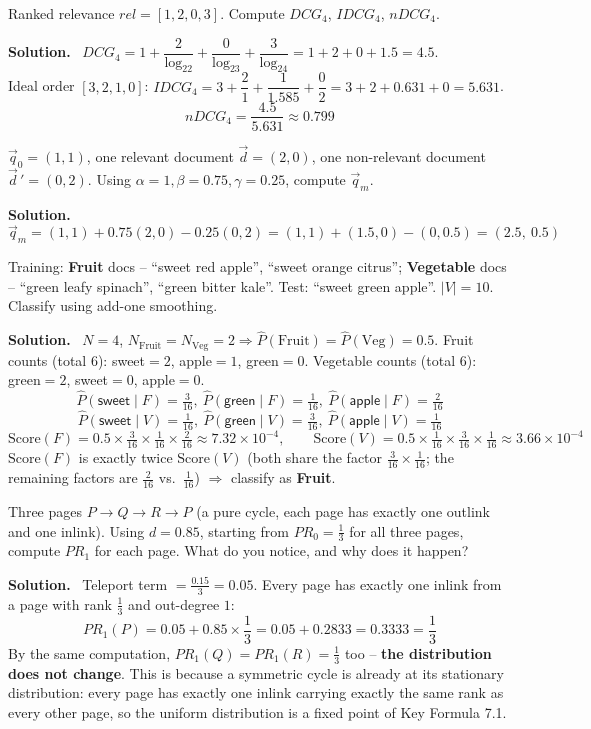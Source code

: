 \documentclass[11pt, a4paper]{article}
\newcommand{\Solution}{\medskip\noindent\textbf{\color{exgreen}Solution.}\ }
\begin{document}
\begin{exercisebox}
Ranked relevance $rel=[1,2,0,3]$. Compute $DCG_4$, $IDCG_4$, $nDCG_4$.
\end{exercisebox}
\Solution
$DCG_4 = 1+\dfrac{2}{\log_22}+\dfrac{0}{\log_23}+\dfrac{3}{\log_24} = 1+2+0+1.5=4.5$.\\
Ideal order $[3,2,1,0]$: $IDCG_4 = 3+\dfrac{2}{1}+\dfrac{1}{1.585}+\dfrac{0}{2} = 3+2+0.631+0=5.631$.
\[
nDCG_4 = \frac{4.5}{5.631} \approx 0.799
\]

\begin{exercisebox}
$\vec q_0=(1,1)$, one relevant document $\vec d=(2,0)$, one non-relevant document $\vec d\,'=(0,2)$. Using $\alpha=1,\beta=0.75,\gamma=0.25$, compute $\vec q_m$.
\end{exercisebox}
\Solution
\[
\vec q_m = (1,1) + 0.75(2,0) - 0.25(0,2) = (1,1)+(1.5,0)-(0,0.5) = (2.5,\ 0.5)
\]

\begin{exercisebox}
Training: \textbf{Fruit} docs -- ``sweet red apple'', ``sweet orange citrus''; \textbf{Vegetable} docs -- ``green leafy spinach'', ``green bitter kale''. Test: ``sweet green apple''. $|V|=10$. Classify using add-one smoothing.
\end{exercisebox}
\Solution
$N=4$, $N_{\text{Fruit}}=N_{\text{Veg}}=2 \Rightarrow \hat P(\text{Fruit})=\hat P(\text{Veg})=0.5$. Fruit counts (total $6$): sweet$=2$, apple$=1$, green$=0$. Vegetable counts (total $6$): green$=2$, sweet$=0$, apple$=0$.
\[
\hat P(\textsf{sweet}\mid F)=\tfrac{3}{16},\ \hat P(\textsf{green}\mid F)=\tfrac{1}{16},\ \hat P(\textsf{apple}\mid F)=\tfrac{2}{16}
\]
\[
\hat P(\textsf{sweet}\mid V)=\tfrac{1}{16},\ \hat P(\textsf{green}\mid V)=\tfrac{3}{16},\ \hat P(\textsf{apple}\mid V)=\tfrac{1}{16}
\]
\[
\text{Score}(F) = 0.5\times\tfrac{3}{16}\times\tfrac{1}{16}\times\tfrac{2}{16} \approx 7.32\times10^{-4}, \qquad
\text{Score}(V) = 0.5\times\tfrac{1}{16}\times\tfrac{3}{16}\times\tfrac{1}{16} \approx 3.66\times10^{-4}
\]
$\text{Score}(F)$ is exactly twice $\text{Score}(V)$ (both share the factor $\tfrac{3}{16}\times\tfrac1{16}$; the remaining factors are $\tfrac{2}{16}$ vs.\ $\tfrac1{16}$) $\Rightarrow$ classify as \textbf{Fruit}.

\begin{exercisebox}
Three pages $P\to Q\to R\to P$ (a pure cycle, each page has exactly one outlink and one inlink). Using $d=0.85$, starting from $PR_0=\tfrac13$ for all three pages, compute $PR_1$ for each page. What do you notice, and why does it happen?
\end{exercisebox}
\Solution
Teleport term $=\frac{0.15}{3}=0.05$. Every page has exactly one inlink from a page with rank $\tfrac13$ and out-degree $1$:
\[
PR_1(P) = 0.05 + 0.85\times\frac13 = 0.05+0.2833 = 0.3333 = \frac13
\]
By the same computation, $PR_1(Q)=PR_1(R)=\tfrac13$ too -- \textbf{the distribution does not change}. This is because a symmetric cycle is already at its stationary distribution: every page has exactly one inlink carrying exactly the same rank as every other page, so the uniform distribution is a fixed point of Key Formula 7.1.
\end{document}
